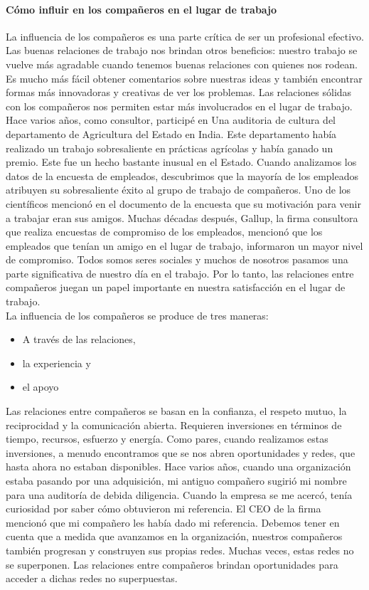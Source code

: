 \documentclass[10pt]{book}
\begin{document}
\paragraph{Cómo influir en los compañeros en el lugar de trabajo} La influencia de los compañeros es una parte crítica de ser un profesional efectivo. Las buenas relaciones de trabajo nos brindan otros beneficios: nuestro trabajo se vuelve más agradable cuando tenemos buenas relaciones con quienes nos rodean. Es mucho más fácil obtener comentarios sobre nuestras ideas y también encontrar formas más innovadoras y creativas de ver los problemas. Las relaciones sólidas con los compañeros nos permiten estar más involucrados en el lugar de trabajo.\\
Hace varios años, como consultor, participé en Una auditoria de cultura del departamento de Agricultura del Estado en India. Este departamento había realizado un trabajo sobresaliente en prácticas agrícolas y había ganado un premio. Este fue un hecho bastante inusual en el Estado. Cuando analizamos los datos de la encuesta de empleados, descubrimos que la mayoría de los empleados atribuyen su sobresaliente éxito al grupo de trabajo de compañeros. Uno de los científicos mencionó en el documento de la encuesta que su motivación para venir a trabajar eran sus amigos. Muchas décadas después, Gallup, la firma consultora que realiza encuestas de compromiso de los empleados, mencionó que los empleados que tenían un amigo en el lugar de trabajo, informaron un mayor nivel de compromiso. Todos somos seres sociales y muchos de nosotros pasamos una parte significativa de nuestro día en el trabajo. Por lo tanto, las relaciones entre compañeros juegan un papel importante en nuestra satisfacción en el lugar de trabajo.\\
La influencia de los compañeros se produce de tres maneras: 
\begin{itemize}
\item A través de las relaciones,
\item la experiencia y 
\item el apoyo
\end{itemize} 
Las relaciones entre compañeros se basan en la confianza, el respeto mutuo, la reciprocidad y la comunicación abierta. Requieren inversiones en términos de tiempo, recursos, esfuerzo y energía. Como pares, cuando realizamos estas inversiones, a menudo encontramos que se nos abren oportunidades y redes, que hasta ahora no estaban disponibles. Hace varios años, cuando una organización estaba pasando por una adquisición, mi antiguo compañero sugirió mi nombre para una auditoría de debida diligencia. Cuando la empresa se me acercó, tenía curiosidad por saber cómo obtuvieron mi referencia. El CEO de la firma mencionó que mi compañero les había dado mi referencia. Debemos tener en cuenta que a medida que avanzamos en la organización, nuestros compañeros también progresan y construyen sus propias redes. Muchas veces, estas redes no se superponen. Las relaciones entre compañeros brindan oportunidades para acceder a dichas redes no superpuestas.\\
\end{document}
